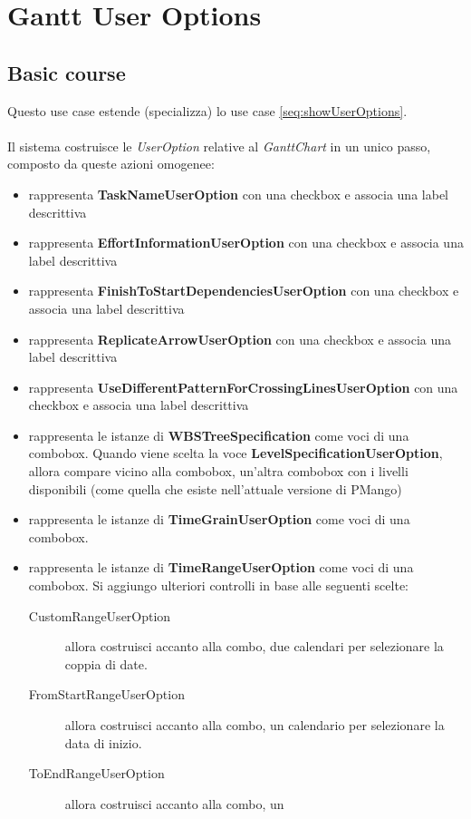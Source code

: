 \section{Gantt User Options}
\label{seq:ganttUserOption}
\subsection{Basic course}
Questo use case estende (specializza) lo use case \ref{seq:showUserOptions}.
\\ \\
Il sistema costruisce le \emph{UserOption} relative al \emph{GanttChart} in un
unico passo, composto da queste azioni omogenee:
\begin{itemize}
  \item rappresenta \textbf{TaskNameUserOption} con una checkbox e associa una
  label descrittiva
  \item rappresenta \textbf{EffortInformationUserOption} con una checkbox e associa una
  label descrittiva
  \item rappresenta \textbf{FinishToStartDependenciesUserOption} con una checkbox e associa una
  label descrittiva
  \item rappresenta \textbf{ReplicateArrowUserOption} con una checkbox e associa una
  label descrittiva
  \item rappresenta \textbf{UseDifferentPatternForCrossingLinesUserOption} con una checkbox e associa una
  label descrittiva
  \item rappresenta le istanze di \textbf{WBSTreeSpecification} come voci di una
  combobox. Quando viene scelta la voce \textbf{LevelSpecificationUserOption}, allora
  compare vicino alla combobox, un'altra combobox con i livelli disponibili
  (come quella che esiste nell'attuale versione di PMango)
  \item rappresenta le istanze di \textbf{TimeGrainUserOption} come voci di una
  combobox.
  \item rappresenta le istanze di \textbf{TimeRangeUserOption} come voci di una
  combobox. Si aggiungo ulteriori controlli in base alle seguenti scelte:
  \begin{description}
    \item[CustomRangeUserOption] allora costruisci accanto alla combo, due
    calendari per selezionare la coppia di date.
    \item[FromStartRangeUserOption] allora costruisci accanto alla combo, un
    calendario per selezionare la data di inizio.
    \item[ToEndRangeUserOption] allora costruisci accanto alla combo, un

\end{description}
\end{itemize}
